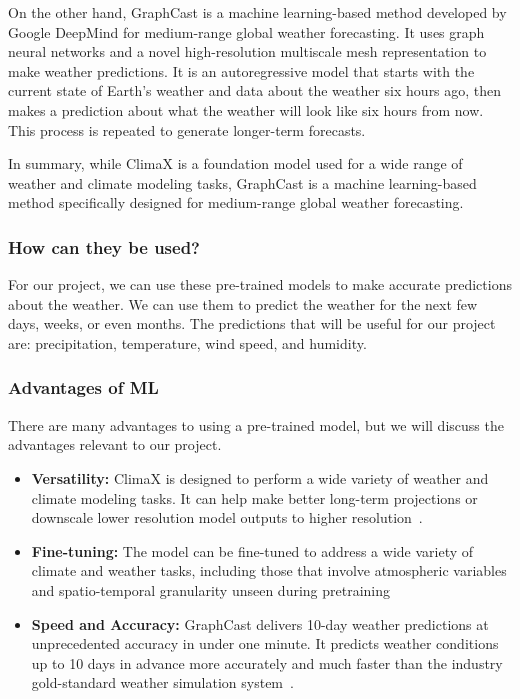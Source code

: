\documentclass[../paper.tex]{subfiles}
\begin{document}
    On the other hand, GraphCast is a machine learning-based method developed by Google DeepMind for medium-range global weather forecasting.
    It uses graph neural networks and a novel high-resolution multiscale mesh representation to make weather predictions.
    It is an autoregressive model that starts with the current state of Earth's weather and data about the weather six hours ago, then makes a prediction about what the weather will look like six hours from now.
    This process is repeated to generate longer-term forecasts.

In summary, while ClimaX is a foundation model used for a wide range of weather and climate modeling tasks, GraphCast is a machine learning-based method specifically designed for medium-range global weather forecasting.
\subsubsection{How can they be used?}
    For our project, we can use these pre-trained models to make accurate predictions about the weather.
    We can use them to predict the weather for the next few days, weeks, or even months.
    The predictions that will be useful for our project are: precipitation, temperature, wind speed, and humidity.
\subsubsection{Advantages of ML}
    There are many advantages to using a pre-trained model, but we will discuss the advantages relevant to our project.
    \begin{itemize}
        \item \textbf{Versatility:} ClimaX is designed to perform a wide variety of weather and climate modeling tasks.
        It can help make better long-term projections or downscale lower resolution model outputs to higher resolution~\cite{d1}.
        \item \textbf{Fine-tuning:} The model can be fine-tuned to address a wide variety of climate and weather tasks, including those that involve atmospheric variables and spatio-temporal granularity unseen during pretraining~\cite{d1}
        \item \textbf{Speed and Accuracy:} GraphCast delivers 10-day weather predictions at unprecedented accuracy in under one minute.
        It predicts weather conditions up to 10 days in advance more accurately and much faster than the industry gold-standard weather simulation system~\cite{e5}.
    \end{itemize}
\end{document}

